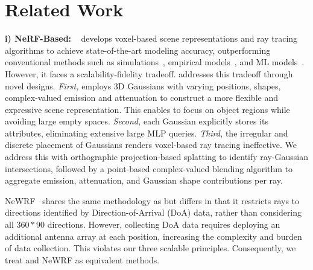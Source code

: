\section{Related Work}
\label{sec_relatedWork}


\textbf{i) NeRF-Based:}
\nerft~\cite{zhao2023nerf} develops voxel-based scene representations and ray tracing algorithms to achieve state-of-the-art modeling accuracy, outperforming conventional methods such as simulations~\cite{wirelessinsite_web, orekondy2022winert, RayTracingToolbox}, empirical models~\cite{rappaport1996wireless, parsons2012mobile, hata1980empirical}, and ML models~\cite{parralejo2021comparative, liu2021fire, malmirchegini2012spatial}.  
However, it faces a scalability-fidelity tradeoff.  
\ourSystem addresses this tradeoff through novel designs.
\textit{First,} \ourSystem employs 3D Gaussians with varying positions, shapes, complex-valued emission and attenuation to construct a more flexible and expressive scene representation.
This enables \ourSystem to focus on object regions while avoiding large empty spaces.
\textit{Second,} each Gaussian explicitly stores its attributes, eliminating extensive large MLP queries.
\textit{Third,} the irregular and discrete placement of Gaussians renders voxel-based ray tracing ineffective. 
We address this with orthographic projection-based splatting to identify ray-Gaussian intersections, followed by a point-based complex-valued blending algorithm to aggregate emission, attenuation, and Gaussian shape contributions per ray.


NeWRF~\cite{lunewrf} shares the same methodology as \nerft but differs in that it restricts rays to directions identified by Direction-of-Arrival (DoA) data, rather than considering all \(360*90\) directions.  
However, collecting DoA data requires deploying an additional antenna array at each position, increasing the complexity and burden of data collection.
This violates our three scalable principles.  
Consequently, we treat \nerft and NeWRF as equivalent methods.